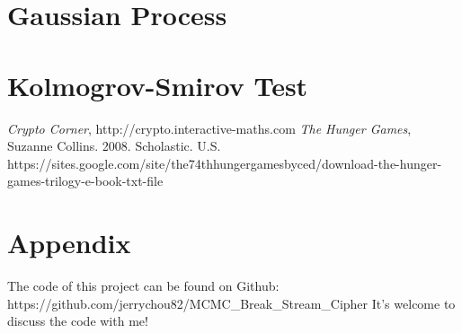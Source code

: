 \documentclass[a4paper, 11pt]{article} %
\begin{document}
\section{Gaussian Process}



\section{Kolmogrov-Smirov Test}







\begin{thebibliography}{9}

\emph{Crypto Corner},
http://crypto.interactive-maths.com
\emph{The Hunger Games}, Suzanne Collins. 2008. Scholastic. U.S.
https://sites.google.com/site/the74thhungergamesbyced/download-the-hunger-games-trilogy-e-book-txt-file
\end{thebibliography}

\section*{Appendix}
The code of this project can be found on Github: https://github.com/jerrychou82/MCMC\_Break\_Stream\_Cipher
It's welcome to discuss the code with me!
\end{document}
